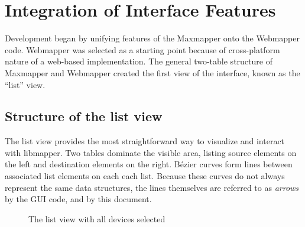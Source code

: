 \section{Integration of Interface Features} %
\label{sec:integration_of_interface_features}

Development began by unifying features of the Maxmapper onto the Webmapper code. Webmapper was selected as a starting point because of cross-platform nature of a web-based implementation. The general two-table structure of Maxmapper and Webmapper created the first view of the interface, known as the ``list'' view.

	\subsection{Structure of the list view} %
	\label{sub:the_list_view}

The list view provides the most straightforward way to visualize and interact with libmapper. Two tables dominate the visible area, listing source elements on the left and destination elements on the right. B\'ezier curves form lines between associated list elements on each each list. Because these curves do not always represent the same data structures, the lines themselves are referred to as \emph{arrows} by the GUI code, and by this document.

\begin{figure}[ht]
\centering
\caption{The list view with all devices selected}
\label{fig:list_view_all_devices}
\end{figure}

